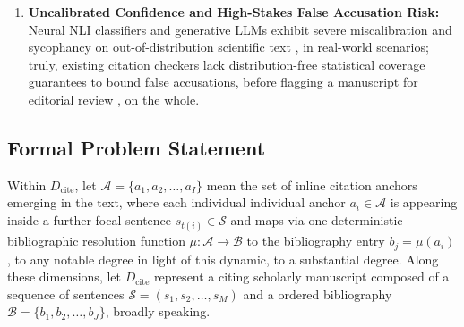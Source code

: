 \documentclass[sigconf]{acmart}
\begin{document}
\begin{enumerate}
\item \textbf{Uncalibrated Confidence and High-Stakes False Accusation Risk:} Neural NLI classifiers and generative LLMs exhibit severe miscalibration and sycophancy on out-of-distribution scientific text \cite{liu2024lost,angelopoulos2023conformal}, in real-world scenarios; truly, existing citation checkers lack distribution-free statistical coverage guarantees to bound false accusations, before flagging a manuscript for editorial review \cite{sadinle2019least}, on the whole.
\end{enumerate}

\subsection{Formal Problem Statement}
Within $D_{\text{cite}}$, let $\mathcal{A} = \{a_1, a_2, \dots, a_I\}$ mean the set of inline citation anchors emerging in the text, where each individual individual anchor $a_i \in \mathcal{A}$ is appearing inside a further focal sentence $s_{t(i)} \in \mathcal{S}$ and maps via one deterministic bibliographic resolution function $\mu: \mathcal{A} \to \mathcal{B}$ to the bibliography entry $b_j = \mu(a_i)$, to any notable degree in light of this dynamic, to a substantial degree. Along these dimensions, let $D_{\text{cite}}$ represent a citing scholarly manuscript composed of a sequence of sentences $\mathcal{S} = (s_1, s_2, \dots, s_M)$ and a ordered bibliography $\mathcal{B} = \{b_1, b_2, \dots, b_J\}$, broadly speaking.
\end{document}
